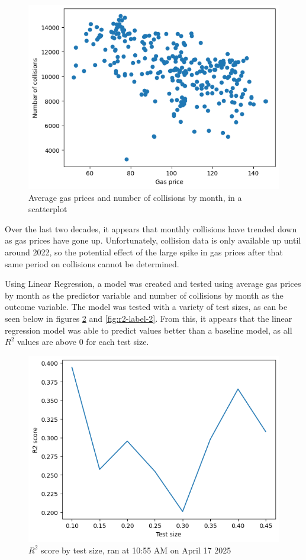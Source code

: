 \documentclass[runningheads]{llncs}
\begin{document}
\begin{figure}
    \centering
    \includegraphics[scale=0.75]{Scatter.png}   
    \caption{Average gas prices and number of collisions by month, in a scatterplot}
    \label{fig:scatter-label}
\end{figure}

Over the last two decades, it appears that monthly collisions have trended down as gas prices have gone up. Unfortunately, collision data is only available up until around 2022, so the potential effect of the large spike in gas prices after that same period on collisions cannot be determined.

Using Linear Regression, a model was created and tested using average gas prices by month as the predictor variable and number of collisions by month as the outcome variable. The model was tested with a variety of test sizes, as can be seen below in figures \ref{fig:r2-label} and \ref{fig:r2-label-2}. From this, it appears that the linear regression model was able to predict
values better than a baseline model, as all \(R^2\) values are above 0 for each test size. 
\begin{figure}
    \centering
    \includegraphics[scale=0.75]{LinRegChart1055Apr17.png}   
    \caption{\(R^2\) score by test size, ran at 10:55 AM on April 17 2025}
    \label{fig:r2-label}
\end{figure}
\end{document}
